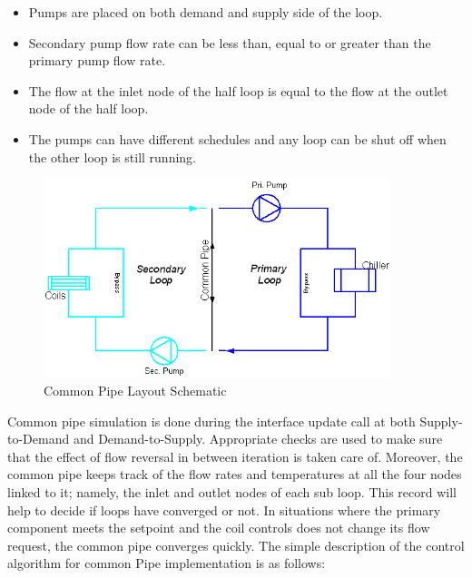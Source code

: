 \begin{itemize}
\item
  Pumps are placed on both demand and supply side of the loop.
\item
  Secondary pump flow rate can be less than, equal to or greater than the primary pump flow rate.
\item
  The flow at the inlet node of the half loop is equal to the flow at the outlet node of the half loop.
\item
  The pumps can have different schedules and any loop can be shut off when the other loop is still running.
\end{itemize}

\begin{figure}[hbtp] %
\centering
\includegraphics[width=0.9\textwidth, height=0.9\textheight, keepaspectratio=true]{media/image1975.png}
\caption{Common Pipe Layout Schematic \protect \label{fig:common-pipe-layout-schematic}}
\end{figure}

Common pipe simulation is done during the interface update call at both Supply-to-Demand and Demand-to-Supply. Appropriate checks are used to make sure that the effect of flow reversal in between iteration is taken care of. Moreover, the common pipe keeps track of the flow rates and temperatures at all the four nodes linked to it; namely, the inlet and outlet nodes of each sub loop. This record will help to decide if loops have converged or not. In situations where the primary component meets the setpoint and the coil controls does not change its flow request, the common pipe converges quickly. The simple description of the control algorithm for common Pipe implementation is as follows:

